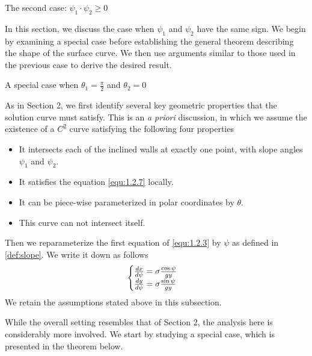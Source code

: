 \documentclass[letterpaper,reqno,10pt,twoside]{amsart}
\theoremstyle{definition}
\theoremstyle{remark}
\begin{document}
    \begin{section}{The second case: $\psi_1\cdot \psi_2\geq 0$ }

    In this section, we discuss the case when $\psi_1$ and $\psi_2$ have the same sign. We begin by examining a special case before establishing the general theorem describing the shape of the surface curve. We then use arguments similar to those used in the previous case to derive the desired result.
    
    \begin{subsection}{A special case when $\theta_1=\frac{\pi}{2}$ and $\theta_2=0$}

    As in Section 2, we first identify several key geometric properties that the solution curve must satisfy. This is an \emph{a priori} discussion, in which we assume the existence of a $C^{2}$ curve satisfying the following four properties

    \begin{itemize}
    
    \item It intersects each of the inclined walls at exactly one point, with slope angles $\psi_{1}$ and $\psi_{2}$.
    
     \item It satisfies the equation \eqref{equ:1.2.7} locally. 
     
    \item It can be piece-wise parameterized in polar coordinates by $\theta$.

    \item This curve can not intersect itself.
    
    \end{itemize}
    Then we reparameterize the first equation of \eqref{equ:1.2.3} by $\psi$ as defined in \ref{def:slope}. We write it down as follows 
    \begin{equation}{\label{equ:bdd_n_1}}
        \begin{cases}
        \frac{dx}{d\psi}=\sigma\frac{\cos\psi}{gy}\\
    \frac{dy}{d\psi}=\sigma\frac{\sin\psi}{gy}\\
    \end{cases}
    \end{equation}
    \noindent We retain the assumptions stated above in this subsection.
    
    While the overall setting resembles that of Section 2, the analysis here is considerably more involved. We start by studying a special case, which is presented in the theorem below.


\end{subsection}
\end{section}
\end{document}
